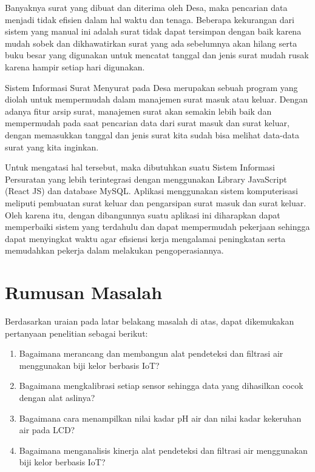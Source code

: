 Banyaknya surat yang dibuat dan diterima oleh Desa, maka pencarian data menjadi tidak efisien dalam hal waktu dan tenaga. Beberapa kekurangan dari sistem yang manual ini adalah surat tidak dapat tersimpan dengan baik karena mudah sobek dan dikhawatirkan surat yang ada sebelumnya akan hilang serta buku besar yang digunakan untuk mencatat tanggal dan jenis surat mudah rusak karena hampir setiap hari digunakan.

Sistem Informasi Surat Menyurat pada Desa merupakan sebuah program yang diolah untuk mempermudah dalam manajemen surat masuk atau keluar. Dengan adanya fitur arsip surat, manajemen surat akan semakin lebih baik dan mempermudah pada saat pencarian data dari surat masuk dan surat keluar, dengan memasukkan tanggal dan jenis surat kita sudah bisa melihat data-data surat yang kita inginkan.

Untuk mengatasi hal tersebut, maka dibutuhkan suatu Sistem Informasi Persuratan yang lebih terintegrasi dengan menggunakan Library JavaScript (React JS) dan database MySQL. Aplikasi menggunakan sistem komputerisasi meliputi pembuatan surat keluar dan pengarsipan surat masuk dan surat keluar. Oleh karena itu, dengan dibangunnya suatu aplikasi ini diharapkan dapat memperbaiki sistem yang terdahulu dan dapat mempermudah pekerjaan sehingga dapat menyingkat waktu agar efisiensi kerja mengalamai peningkatan serta memudahkan pekerja dalam melakukan pengoperasiannya.

\section{Rumusan Masalah}

Berdasarkan uraian pada latar belakang masalah di atas, dapat dikemukakan pertanyaan penelitian sebagai berikut:

\begin{enumerate}[topsep=0pt,itemsep=0pt,partopsep=0pt, parsep=0pt]
    \item Bagaimana merancang dan membangun alat pendeteksi dan filtrasi air menggunakan biji kelor berbasis IoT?
    \item Bagaimana mengkalibrasi setiap sensor sehingga data yang dihasilkan cocok dengan alat aslinya?
    \item Bagaimana cara menampilkan nilai kadar pH air dan nilai kadar kekeruhan air pada LCD?
    \item Bagaimana menganalisis kinerja alat pendeteksi dan filtrasi air menggunakan biji kelor berbasis IoT?
\end{enumerate}

